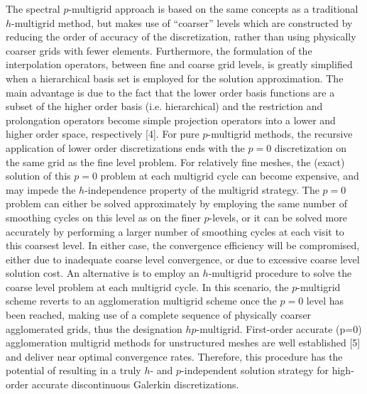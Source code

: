 \documentclass[twosided]{report}
\begin{document}
The spectral $p$-multigrid approach is based on the same concepts as a
traditional $h$-multigrid method, but makes use of ``coarser'' levels
which are constructed by reducing the order of accuracy of the
discretization, rather than using physically coarser grids with fewer
elements. Furthermore, the formulation of the interpolation operators,
between fine and coarse grid levels, is greatly simplified when a
hierarchical basis set is employed for the solution approximation. The
main advantage is due to the fact that the lower order basis functions
are a subset of the higher order basis (i.e. hierarchical) and the
restriction and prolongation operators become simple projection
operators into a lower and higher order space, respectively [4]. For
pure $p$-multigrid methods, the recursive application of lower order
discretizations ends with the $p=0$ discretization on the same grid as
the fine level problem. For relatively fine meshes, the (exact)
solution of this $p=0$ problem at each multigrid cycle can become
expensive, and may impede the $h$-independence property of the multigrid
strategy. The $p=0$ problem can either be solved approximately by
employing the same number of smoothing cycles on this level as on the
finer $p$-levels, or it can be solved more accurately by performing a
larger number of smoothing cycles at each visit to this coarsest level.
In either case, the convergence efficiency will be compromised, either
due to inadequate coarse level convergence, or due to excessive coarse
level solution cost. An alternative is to employ an $h$-multigrid
procedure to solve the coarse level problem at each multigrid cycle. In
this scenario, the $p$-multigrid scheme reverts to an agglomeration
multigrid scheme once the $p=0$ level has been reached, making use of a
complete sequence of physically coarser agglomerated grids, thus the
designation $hp$-multigrid. First-order accurate (p=0) agglomeration
multigrid methods for unstructured meshes are well established [5] and
deliver near optimal convergence rates. Therefore, this procedure has
the potential of resulting in a truly $h$- and $p$-independent solution
strategy for high-order accurate discontinuous Galerkin
discretizations.
\end{document}
